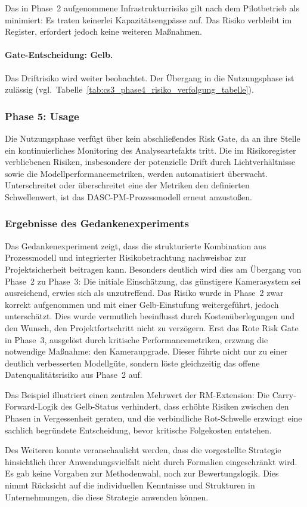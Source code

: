 Das in Phase~2 aufgenommene Infrastrukturrisiko gilt nach dem Pilotbetrieb als
minimiert: Es traten keinerlei Kapazitätsengpässe auf. Das Risiko verbleibt im Register, 
erfordert jedoch keine weiteren Maßnahmen.

\paragraph{Gate-Entscheidung: Gelb.}
Das Driftrisiko wird weiter beobachtet. Der Übergang in die Nutzungsphase ist
zulässig (vgl.\ Tabelle~\ref{tab:cs3_phase4_risiko_verfolgung_tabelle}).

\subsubsection{Phase 5: Usage}

Die Nutzungsphase verfügt über kein abschließendes Risk Gate, da an ihre Stelle
ein kontinuierliches Monitoring des Analyseartefakts tritt. Die im Risikoregister
verbliebenen Risiken, insbesondere der potenzielle Drift durch Lichtverhältnisse
sowie die Modellperformancemetriken, werden automatisiert überwacht. Unterschreitet
oder überschreitet eine der Metriken den definierten Schwellenwert, ist das DASC-PM-Prozessmodell
erneut anzustoßen.

\subsubsection{Ergebnisse des Gedankenexperiments}

Das Gedankenexperiment zeigt, dass die strukturierte Kombination aus Prozessmodell
und integrierter Risikobetrachtung nachweisbar zur Projektsicherheit beitragen kann.
Besonders deutlich wird dies am Übergang von Phase~2 zu Phase~3: Die initiale
Einschätzung, das günstigere Kamerasystem sei ausreichend, erwies sich als
unzutreffend. Das Risiko wurde in Phase~2 zwar korrekt aufgenommen und mit einer
Gelb-Einstufung weitergeführt, jedoch unterschätzt. Dies wurde vermutlich beeinflusst durch
Kostenüberlegungen und den Wunsch, den Projektfortschritt nicht zu verzögern.
Erst das Rote Risk Gate in Phase~3, ausgelöst durch kritische Performancemetriken,
erzwang die notwendige Maßnahme: den Kameraupgrade. Dieser führte nicht nur zu
einer deutlich verbesserten Modellgüte, sondern löste gleichzeitig das offene
Datenqualitätsrisiko aus Phase~2 auf.

Das Beispiel illustriert einen zentralen Mehrwert der RM-Extension: Die
Carry-Forward-Logik des Gelb-Status verhindert, dass erhöhte Risiken zwischen den
Phasen in Vergessenheit geraten, und die verbindliche Rot-Schwelle erzwingt eine
sachlich begründete Entscheidung, bevor kritische Folgekosten entstehen.

Des Weiteren konnte veranschaulicht werden, dass die vorgestellte Strategie 
hinsichtlich ihrer Anwendungsvielfalt nicht durch Formalien eingeschränkt 
wird. Es gab keine Vorgaben zur Methodenwahl, noch zur Bewertungslogik. 
Dies nimmt Rücksicht auf die individuellen Kenntnisse und Strukturen in 
Unternehmungen, die diese Strategie anwenden können.
